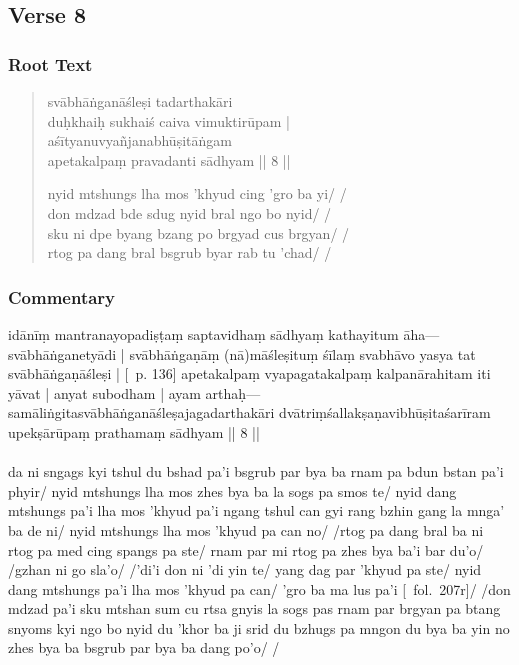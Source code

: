 \documentclass[12pt]{article}
\newcommand{\emdash} {\hspace{0em}—\hspace{0em}}
\begin{document}
\subsection{Verse 8}
\subsubsection{Root Text}
\begin{quote}
	svābhāṅganāśleṣi tadarthakāri\footnoteB{
		tadarthakāri] \EDD\ ; ta..rthakāri \MS\ (\emph{akṣara uncertain})
	} \\
	duḥkhaiḥ sukhaiś caiva vimuktirūpam |\\
	aśītyanuvyañjanabhūṣitāṅgam \\
	apetakalpaṃ pravadanti sādhyam || 8 ||

	nyid mtshungs lha mos 'khyud cing 'gro ba yi/ /\\
	don mdzad bde sdug nyid bral ngo bo nyid/ /\\
	sku ni dpe byang bzang po brgyad cus brgyan/ /\\
	rtog pa dang bral bsgrub byar rab tu 'chad/ /
\end{quote}

\subsubsection{Commentary}
idānīṃ mantranayopadiṣṭaṃ saptavidhaṃ sādhyaṃ kathayitum āha\emdash svābhāṅganetyādi | svābhāṅgaṇāṃ (nā)māśleṣituṃ śīlaṃ svabhāvo yasya tat svābhāṅgaṇāśleṣi | [\EDD\ p. 136] apetakalpaṃ vyapagatakalpaṃ kalpanārahitam iti yāvat | anyat subodham | ayam arthaḥ\emdash samāliṅgitasvābhāṅganāśleṣajagadarthakāri dvātriṃśallakṣaṇavibhūṣitaśarīram upekṣārūpaṃ prathamaṃ sādhyam || 8 ||\\

\textbf{\TVA}\\
da ni sngags kyi tshul du bshad pa'i bsgrub par bya ba rnam pa bdun bstan pa'i phyir/ nyid mtshungs lha mos zhes bya ba la sogs pa smos te/ nyid dang mtshungs pa'i lha mos 'khyud pa'i ngang tshul can gyi rang bzhin gang la mnga' ba de ni/ nyid mtshungs lha mos 'khyud pa can no/ /rtog pa dang bral ba ni rtog pa med cing spangs pa ste/ rnam par mi rtog pa zhes bya ba'i bar du'o/ /gzhan ni go sla'o/ /'di'i don ni 'di yin te/ yang dag par 'khyud pa ste/ nyid dang mtshungs pa'i lha mos 'khyud pa can/ 'gro ba ma lus pa'i [\TVA\ fol.\ 207r]/ /don mdzad pa'i sku mtshan sum cu rtsa gnyis la sogs pas rnam par brgyan pa btang snyoms kyi ngo bo nyid du 'khor ba ji srid du bzhugs pa mngon du bya ba yin no zhes bya ba bsgrub par bya ba dang po'o/ /\\
\end{document}
